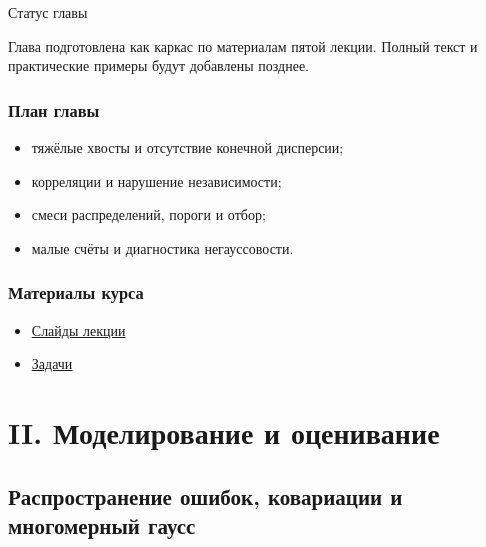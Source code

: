 \documentclass[
  russian,
  letterpaper,
]{scrbook}
\providecommand{\tightlist}{%
  \setlength{\itemsep}{0pt}\setlength{\parskip}{0pt}}
\begin{document}
{Статус главы}

Глава подготовлена как каркас по материалам пятой лекции. Полный текст и
практические примеры будут добавлены позднее.

\section{План
главы}\label{ux43fux43bux430ux43d-ux433ux43bux430ux432ux44b-3}

\begin{itemize}
\tightlist
\item
  тяжёлые хвосты и отсутствие конечной дисперсии;
\item
  корреляции и нарушение независимости;
\item
  смеси распределений, пороги и отбор;
\item
  малые счёты и диагностика негауссовости.
\end{itemize}

\section{Материалы
курса}\label{ux43cux430ux442ux435ux440ux438ux430ux43bux44b-ux43aux443ux440ux441ux430-2}

\begin{itemize}
\tightlist
\item
  \href{https://neutrinohit.github.io/statistical-analysis-course/ru/slides/04_non_gaussian_clt_violations.html}{Слайды
  лекции}
\item
  \href{https://neutrinohit.github.io/statistical-analysis-course/ru/slides/exercises/04_non_gaussian_clt_violations_exercises.html}{Задачи}
\end{itemize}

\part{II. Моделирование и оценивание}

\chapter{Распространение ошибок, ковариации и многомерный
гаусс}\label{ux440ux430ux441ux43fux440ux43eux441ux442ux440ux430ux43dux435ux43dux438ux435-ux43eux448ux438ux431ux43eux43a-ux43aux43eux432ux430ux440ux438ux430ux446ux438ux438-ux438-ux43cux43dux43eux433ux43eux43cux435ux440ux43dux44bux439-ux433ux430ux443ux441ux441}
\end{document}
